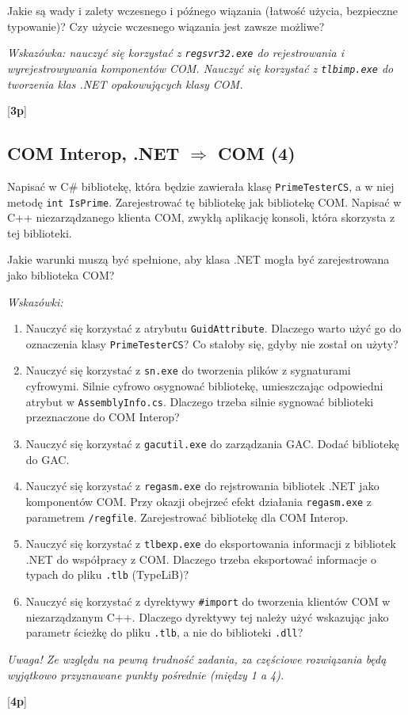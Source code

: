      Jakie są wady i zalety wczesnego i późnego wiązania
      (łatwość użycia, bezpieczne typowanie)? Czy użycie wczesnego wiązania jest zawsze możliwe?

      {\em Wskazówka: nauczyć się korzystać z {\tt regsvr32.exe} do rejestrowania i wyrejestrowywania 
      komponentów COM. Nauczyć się korzystać z {\tt tlbimp.exe} do tworzenia klas .NET opakowujących klasy COM.}

      [{\bf 3p}]

\subsection{COM Interop, .NET $\Rightarrow$ COM (4)}

      Napisać w C\# bibliotekę, która będzie zawierała klasę {\tt PrimeTesterCS}, a w niej metodę {\tt int IsPrime}.
\label{cominterop_duzy}	  
      Zarejestrować tę bibliotekę jak bibliotekę COM. Napisać w C++ niezarządzanego klienta COM, 
      zwykłą aplikację konsoli, która skorzysta z tej biblioteki.
      
      Jakie warunki muszą być spełnione, aby klasa .NET mogła być zarejestrowana jako 
      biblioteka COM?

      {\em Wskazówki: 
      
      \begin{enumerate}
      \item 
      Nauczyć się korzystać z atrybutu {\tt GuidAttribute}. 
      Dlaczego warto użyć go do oznaczenia klasy {\tt PrimeTesterCS}? Co stałoby się, gdyby
      nie został on użyty?
      
      \item 
      Nauczyć się korzystać z {\tt sn.exe} do tworzenia plików z sygnaturami cyfrowymi.
      Silnie cyfrowo osygnować bibliotekę, umieszczając odpowiedni atrybut w {\tt AssemblyInfo.cs}.
      Dlaczego trzeba silnie sygnować biblioteki przeznaczone do COM Interop?
            
      \item 
      Nauczyć się korzystać z {\tt gacutil.exe} do zarządzania GAC. Dodać bibliotekę do GAC.
            
      \item 
      Nauczyć się korzystać z {\tt regasm.exe} do rejstrowania bibliotek .NET jako komponentów COM.
      Przy okazji obejrzeć efekt działania {\tt regasm.exe} z parametrem {\tt /regfile}. Zarejestrować bibliotekę
      dla COM Interop.
      
      \item 
      Nauczyć się korzystać z {\tt tlbexp.exe} do eksportowania informacji z bibliotek .NET do
      współpracy z COM. Dlaczego trzeba eksportować informacje o typach do pliku {\tt *.tlb} (TypeLiB)?
      
      \item 
      Nauczyć się korzystać z dyrektywy {\tt \#import} do tworzenia klientów COM w niezarządzanym C++.
      Dlaczego dyrektywy tej należy użyć wskazując jako parametr ścieżkę do pliku {\tt *.tlb}, 
      a nie do biblioteki {\tt *.dll}?
      \end{enumerate}
      }
      
      {\em Uwaga! Ze względu na pewną trudność zadania, za częściowe rozwiązania będą wyjątkowo
      przyznawane punkty pośrednie (między 1 a 4).}
      
      [{\bf 4p}]

